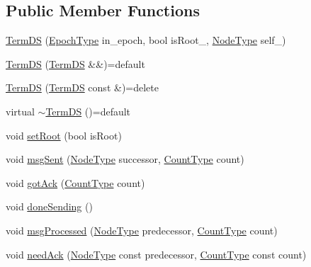 \subsection*{Public Member Functions}
\begin{DoxyCompactItemize}
\item 
\hyperlink{structvt_1_1term_1_1ds_1_1_term_d_s_a1873de7f6d3009bd997c64eefb46d9b5}{Term\+DS} (\hyperlink{namespacevt_a985a5adf291c34a3ca263b3378388236}{Epoch\+Type} in\+\_\+epoch, bool is\+Root\+\_\+, \hyperlink{namespacevt_a866da9d0efc19c0a1ce79e9e492f47e2}{Node\+Type} self\+\_\+)
\item 
\hyperlink{structvt_1_1term_1_1ds_1_1_term_d_s_a01ffd2a7fc4410599708c3fcb5998743}{Term\+DS} (\hyperlink{structvt_1_1term_1_1ds_1_1_term_d_s}{Term\+DS} \&\&)=default
\item 
\hyperlink{structvt_1_1term_1_1ds_1_1_term_d_s_a513d27464e9c231a24a755bf80a93dcd}{Term\+DS} (\hyperlink{structvt_1_1term_1_1ds_1_1_term_d_s}{Term\+DS} const \&)=delete
\item 
virtual \hyperlink{structvt_1_1term_1_1ds_1_1_term_d_s_ab7990eff9ce88551b3e2133f1664593a}{$\sim$\+Term\+DS} ()=default
\item 
void \hyperlink{structvt_1_1term_1_1ds_1_1_term_d_s_a684dd240eeab7ef4c2d1477840276f28}{set\+Root} (bool is\+Root)
\item 
void \hyperlink{structvt_1_1term_1_1ds_1_1_term_d_s_af03262950f250a7ebceb7079d3113a58}{msg\+Sent} (\hyperlink{namespacevt_a866da9d0efc19c0a1ce79e9e492f47e2}{Node\+Type} successor, \hyperlink{structvt_1_1term_1_1ds_1_1_term_d_s_a54f4ebd7e1ecb59c32c0f5b03ef9f20b}{Count\+Type} count)
\item 
void \hyperlink{structvt_1_1term_1_1ds_1_1_term_d_s_a6fcd87a189c046c48c341f39f9ea0b69}{got\+Ack} (\hyperlink{structvt_1_1term_1_1ds_1_1_term_d_s_a54f4ebd7e1ecb59c32c0f5b03ef9f20b}{Count\+Type} count)
\item 
void \hyperlink{structvt_1_1term_1_1ds_1_1_term_d_s_a9723c6b5db4318277329570e0974e1c7}{done\+Sending} ()
\item 
void \hyperlink{structvt_1_1term_1_1ds_1_1_term_d_s_a16ad493d9d01db734c20ea9a55b0ffc5}{msg\+Processed} (\hyperlink{namespacevt_a866da9d0efc19c0a1ce79e9e492f47e2}{Node\+Type} predecessor, \hyperlink{structvt_1_1term_1_1ds_1_1_term_d_s_a54f4ebd7e1ecb59c32c0f5b03ef9f20b}{Count\+Type} count)
\item 
void \hyperlink{structvt_1_1term_1_1ds_1_1_term_d_s_ae1f49e96bb1903570e1639685b816388}{need\+Ack} (\hyperlink{namespacevt_a866da9d0efc19c0a1ce79e9e492f47e2}{Node\+Type} const predecessor, \hyperlink{structvt_1_1term_1_1ds_1_1_term_d_s_a54f4ebd7e1ecb59c32c0f5b03ef9f20b}{Count\+Type} const count)

\end{DoxyCompactItemize}
